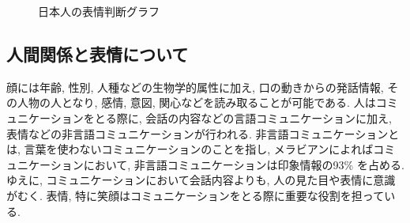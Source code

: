 \begin{figure}[htbp]
    \begin{center}
    \end{center}
    \caption{日本人の表情判断グラフ}
    \label{fig:JapaneseFacialExpression}
\end{figure}

\subsection{人間関係と表情について}
顔には年齢, 性別, 人種などの生物学的属性に加え, 口の動きからの発話情報, その人物の人となり, 感情, 意図, 関心などを読み取ることが可能である.\cite{role_facialexpression_in_communication}
人はコミュニケーションをとる際に, 会話の内容などの言語コミュニケーションに加え, 表情などの非言語コミュニケーションが行われる.
非言語コミュニケーションとは, 言葉を使わないコミュニケーションのことを指し, メラビアンによればコミュニケーションにおいて,
非言語コミュニケーションは印象情報の93\% を占める.\cite {rule_of_Mehrabian}
ゆえに, コミュニケーションにおいて会話内容よりも, 人の見た目や表情に意識がむく.
表情, 特に笑顔はコミュニケーションをとる際に重要な役割を担っている.



